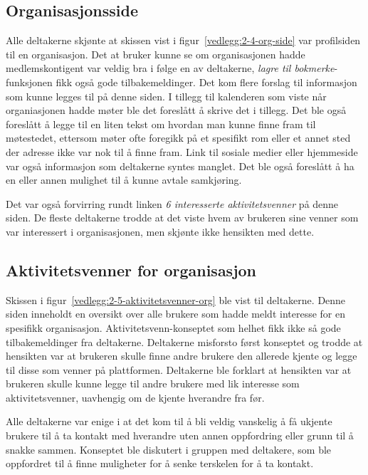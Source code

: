 \subsection{Organisasjonsside}

Alle deltakerne skjønte at skissen vist i figur~\ref{vedlegg:2-4-org-side} var profilsiden til en organisasjon. Det at bruker kunne se om organisasjonen hadde medlemskontigent var veldig bra i følge en av deltakerne, {\em lagre til bokmerke}-funksjonen fikk også gode tilbakemeldinger. Det kom flere forslag til informasjon som kunne legges til på denne siden. I tillegg til kalenderen som viste når organiasjonen hadde møter ble det foreslått å skrive det i tillegg. Det ble også foreslått å legge til en liten tekst om hvordan man kunne finne fram til møtestedet, ettersom møter ofte foregikk på et spesifikt rom eller et annet sted der adresse ikke var nok til å finne fram. Link til sosiale medier eller hjemmeside var også informasjon som deltakerne syntes manglet. Det ble også foreslått å ha en eller annen mulighet til å kunne avtale samkjøring.

Det var også forvirring rundt linken {\em 6 interesserte aktivitetsvenner} på denne siden. De fleste deltakerne trodde at det viste hvem av brukeren sine venner som var interessert i organisasjonen, men skjønte ikke hensikten med dette.


\subsection{Aktivitetsvenner for organisasjon}

Skissen i figur~\ref{vedlegg:2-5-aktivitetsvenner-org} ble vist til deltakerne. Denne siden inneholdt en oversikt over alle brukere som hadde meldt interesse for en spesifikk organisasjon. Aktivitetsvenn-konseptet som helhet fikk ikke så gode tilbakemeldinger fra deltakerne. Deltakerne misforsto først konseptet og trodde at hensikten var at brukeren skulle finne andre brukere den allerede kjente og legge til disse som venner på plattformen. Deltakerne ble forklart at hensikten var at brukeren skulle kunne legge til andre brukere med lik interesse som aktivitetsvenner, uavhengig om de kjente hverandre fra før. 

Alle deltakerne var enige i at det kom til å bli veldig vanskelig å få ukjente brukere til å ta kontakt med hverandre uten annen oppfordring eller grunn til å snakke sammen. Konseptet ble diskutert i gruppen med deltakere, som ble oppfordret til å finne muligheter for å senke terskelen for å ta kontakt. 

